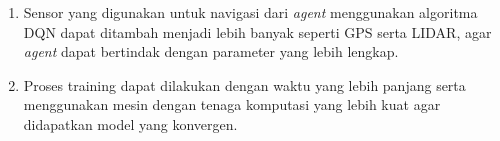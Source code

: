 \begin{enumerate}[nolistsep]

  \item Sensor yang digunakan untuk navigasi dari \textit{agent }menggunakan algoritma DQN dapat ditambah menjadi lebih banyak seperti GPS serta LIDAR, agar \textit{agent} dapat bertindak dengan parameter yang lebih lengkap.

  \item Proses training dapat dilakukan dengan waktu yang lebih panjang serta menggunakan mesin dengan tenaga komputasi yang lebih kuat agar didapatkan model yang konvergen.

  \iffalse
  \item Memperbaiki sistem award, dimana sebaiknya memikirkan sudut kendaraan terhadap pusat bundaran, serta jarak kendaraan terhadap bagian tengah jalan.

  \item Membuat tolak ukur metrik yang memadai untuk bagian pengujian model berupa plot riwayat gerakan kendaraan serta plot kecepatan kendaraan.
  \fi

\end{enumerate}
